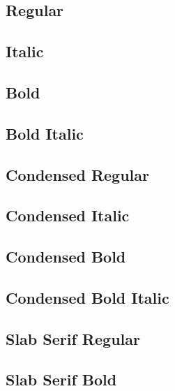 \documentclass{article}
\begin{document}
\subsection*{Regular}
\lipsum[1]

\subsection*{Italic}
\textit{\lipsum[2]}

\subsection*{Bold}

\textbf{\lipsum[3]}



\subsection*{Bold Italic}

\textbf{\textit{\lipsum[4]}}

\robotocondensed

\subsection*{Condensed Regular}

\lipsum[1]

\subsection*{Condensed Italic}

\textit{\lipsum[2]}

\subsection*{Condensed Bold}

\textbf{\lipsum[3]}



\subsection*{Condensed Bold Italic}

\textbf{\textit{\lipsum[4]}}

\robotoslab

\subsection*{Slab Serif Regular}
\lipsum[1]


\subsection*{Slab Serif Bold}

\textbf{\lipsum[3]}
\end{document}
